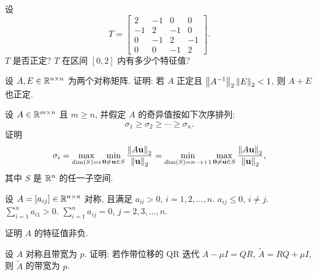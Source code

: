\begin{exercises}
  \item 设
    \[
      T=\begin{bmatrix}
        2 & -1 & 0 & 0\\
        -1 & 2 & -1 & 0\\
        0 & -1 & 2 & -1\\
        0 & 0 & -1 & 2
      \end{bmatrix}.
    \]
    \subquest $T$ 是否正定?
    \subquest $T$ 在区间 $[0,2]$ 内有多少个特征值?

  \item 设 $A,E\in\mathbb{R}^{n\times n}$ 为两个对称矩阵. 证明: 若 $A$ 正定且 $\left\|A^{-1}\right\|_2\left\|E\right\|_2<1$, 则 $A+E$ 也正定.

  \item 设 $A\in\mathbb{R}^{m\times n}$ 且 $m\geqslant n$, 并假定 $A$ 的奇异值按如下次序排列:
    \[
      \sigma_1\geqslant\sigma_2\geqslant\cdots\geqslant\sigma_n.
    \]
    证明
    \[
      \sigma_i=\max_{\dim(S)=i}\min_{\mathbf{0}\neq\mathbf{u}\in S}
      \frac{\left\|A\mathbf{u}\right\|_2}{\left\|\mathbf{u}\right\|_2}
      =\min_{\dim(S)=n-i+1}\max_{\mathbf{0}\neq\mathbf{u}\in S}
      \frac{\left\|A\mathbf{u}\right\|_2}{\left\|\mathbf{u}\right\|_2},
    \]
    其中 $S$ 是 $\mathbb{R}^n$ 的任一子空间.

  \item 设 $A=[a_{ij}]\in\mathbb{R}^{n\times n}$ 对称, 且满足
    \subquest $a_{ii}>0$, $i=1,2,\ldots,n$.
    \subquest $a_{ij}\leqslant0$, $i\neq j$.
    \subquest $\displaystyle\sum_{i=1}^{n}a_{i1}>0$.
    \subquest $\displaystyle\sum_{i=1}^{n}a_{ij}=0$, $j=2,3,\ldots,n$.

    \hspace*{2em}证明 $A$ 的特征值非负.

  \item 设 $A$ 对称且带宽为 $p$. 证明: 若作带位移的 QR 迭代 $A-\mu I=QR$, $\tilde{A}=RQ+\mu I$, 则 $\tilde{A}$ 的带宽为 $p$.
\end{exercises}
